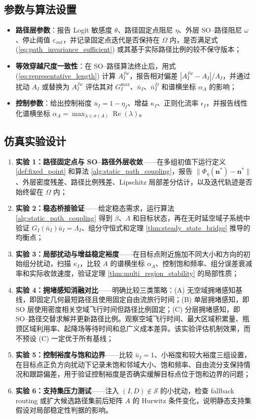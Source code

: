 \documentclass[a4paper,12pt]{article}
\theoremstyle{plain}
\theoremstyle{definition}
\theoremstyle{remark}
\begin{document}
\subsection{参数与算法设置}
\begin{itemize}
    \item \textbf{路径层参数}：报告 Logit 敏感度 $\theta$、路径固定点阻尼 $\eta$、外层 SO--路径阻尼 $\omega$、停止阈值 $\varepsilon_{out}$，并记录固定点迭代是否保持在 $\Omega$ 内，是否满足式 (\ref{eq:path_invariance_sufficient}) 或其基于实际路径比例的较不保守版本；
    \item \textbf{等效穿越尺度一致性}：在 SO--路径算法终止后，用式 (\ref{eq:representative_length}) 计算 $A_I^{fw}$，报告相对偏差 $|A_I^{fw}-A_I|/A_I$，并通过扰动 $A_I$ 或替换为 $A_I^{fw}$ 评估其对 $G_I^{\max}$、$\bar n_I$、$\bar n_I^D$ 和谱横坐标 $\alpha_A$ 的影响；
    \item \textbf{控制参数}：给出控制裕度 $\bar u_I=1-\eta_I$、增益 $\kappa_I$、正则化流率 $\epsilon_I$，并报告线性化谱横坐标 $\alpha_A=\max_{\lambda\in\sigma(A)}\operatorname{Re}(\lambda)$。
\end{itemize}

\subsection{仿真实验设计}
\begin{enumerate}
    \item \textbf{实验 1：路径固定点与 SO--路径外层收敛}——在多组初值下运行定义 \ref{def:fixed_point} 和算法 \ref{alg:static_path_coupling}，报告 $\|\Phi_\eta(\bm n^*)-\bm n^*\|$、外层密度残差、路径比例残差、Lipschitz 局部差分估计，以及迭代轨迹是否始终留在 $\Omega$ 内；
    \item \textbf{实验 2：稳态桥接验证}——给定稳态需求，运行算法 \ref{alg:static_path_coupling} 得到 $\beta$、$\Lambda$ 和目标状态，再在无时延空域子系统中验证 $G_I(\bar n_I)\bar u_I=\Lambda_I$、组分守恒式和定理 \ref{thm:steady_state_bridge} 推导的均衡点；
    \item \textbf{实验 3：局部扰动与增益稳定裕度}——在目标点附近施加不同大小和方向的初始组分扰动，扫描 $\kappa_I$，比较 $A$ 的谱横坐标 $\alpha_A$、控制饱和频率、组分误差衰减率和实际收敛速度，验证定理 \ref{thm:multi_region_stability} 的局部性质；
    \item \textbf{实验 4：拥堵感知消融对比}——明确比较三类策略：(A) 无空域拥堵感知基线，即固定几何最短路径且使用固定自由流旅行时间；(B) 单层拥堵感知，即 SO 层使用密度相关空域飞行时间但路径比例固定；(C) 分层拥堵感知，即 SO--路径交替求解并更新路径比例。观察空域飞行时间、最大区域积累量、瓶颈区域利用率、起降场等待时间和总广义成本差异。该实验评估机制效果，而不预设 (C) 一定优于所有基线；
    \item \textbf{实验 5：控制裕度与饱和边界}——比较 $\bar u_I=1$、小裕度和较大裕度三组设置，在目标点正负方向扰动下记录未饱和邻域大小、饱和频率、自由流分支保持情况和跟踪偏差，用于验证控制裕度是否确实缓解目标点位于饱和边界的问题；
    \item \textbf{实验 6：支持集压力测试}——注入 $(I,D)\notin\mathcal S$ 的小扰动，检查 fallback routing 或扩大候选路径集前后矩阵 $A$ 的 Hurwitz 条件变化，说明静态支持集假设对局部稳定性判据的影响。
\end{enumerate}
\end{document}
